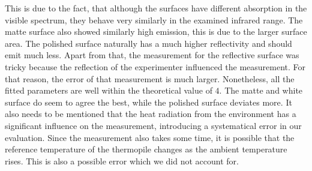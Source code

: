 \documentclass[a4paper,10pt,twocolumn]{article}
\begin{document}
    This is due to the fact, that although the surfaces have different absorption in the visible spectrum, they behave very similarly in the examined infrared range.
    The matte surface also showed similarly high emission, this is due to the larger surface area.
    The polished surface naturally has a much higher reflectivity and should emit much less.
    Apart from that, the measurement for the reflective surface was tricky because the reflection of the experimenter influenced the measurement.
    For that reason, the error of that measurement is much larger.
    Nonetheless, all the fitted parameters are well within the theoretical value of $4$.
    The matte and white surface do seem to agree the best, while the polished surface deviates more.
    It also needs to be mentioned that the heat radiation from the environment has a significant influence on the measurement, introducing a systematical error in our evaluation.
    Since the measurement also takes some time, it is possible that the reference temperature of the thermopile changes as the ambient temperature rises.
    This is also a possible error which we did not account for.
    
    
    
    
\end{document}
